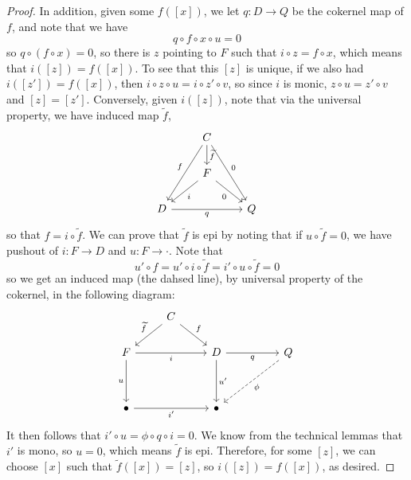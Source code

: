 \documentclass[aps,pra,showpacs,notitlepage,onecolumn,superscriptaddress,nofootinbib]{revtex4-1}
\theoremstyle{definition}
\begin{document}
\begin{proof}
  In addition,
  given some $f([x])$, we let $q : D \rightarrow Q$ be the cokernel map of $f$, and note that we have
  \begin{equation}
     q \circ f \circ x \circ u = 0
    \end{equation}
  so $q \circ (f \circ x) = 0$, so there is $z$ pointing to $F$ such that $i \circ z = f \circ x$, which means that $i([z]) = f([x])$. To see that this $[z]$ is unique, if we also had $i([z']) = f([x])$,
  then $i \circ z \circ u = i \circ z' \circ v$, so since $i$ is monic, $z \circ u = z' \circ v$ and $[z] = [z']$. Conversely, given $i([z])$, note that via the universal property, we have induced map $\widetilde{f}$,
  \[\begin{tikzcd}
	& C \\
	& F \\
	D && Q
	\arrow["{\widetilde{f}}", from=1-2, to=2-2]
	\arrow["f"', from=1-2, to=3-1]
	\arrow["0", from=1-2, to=3-3]
	\arrow["i", from=2-2, to=3-1]
	\arrow["0"', from=2-2, to=3-3]
	\arrow["q"', from=3-1, to=3-3]
  \end{tikzcd}\]
  so that $f = i \circ \widetilde{f}$. We can prove that $\widetilde{f}$ is epi by noting that if $u \circ \widetilde{f} = 0$, we have pushout of $i : F \rightarrow D$ and $u : F \rightarrow \cdot$.
  Note that
  \begin{equation}
  u' \circ f = u' \circ i \circ \widetilde{f} = i' \circ u \circ \widetilde{f} = 0
  \end{equation}
  so we get an induced map (the dahsed line), by universal property of the cokernel, in the following diagram:
  \[\begin{tikzcd}
	& C \\
	F && D && Q \\
	\\
	\bullet && \bullet
	\arrow["{\widetilde{f}}"', from=1-2, to=2-1]
	\arrow["f", from=1-2, to=2-3]
	\arrow["i"', from=2-1, to=2-3]
	\arrow["u"', from=2-1, to=4-1]
	\arrow["q"', from=2-3, to=2-5]
	\arrow["{u'}", from=2-3, to=4-3]
	\arrow["\phi", dashed, from=2-5, to=4-3]
	\arrow["{i'}"', from=4-1, to=4-3]
  \end{tikzcd}\]
  It then follows that $i' \circ u = \phi \circ q \circ i = 0$. We know from the technical lemmas that $i'$ is mono, so $u = 0$, which means $\widetilde{f}$ is epi. Therefore, for some $[z]$, we can choose $[x]$
  such that $\widetilde{f}([x]) = [z]$, so $i([z]) = f([x])$, as desired.


\end{proof}
\end{document}
